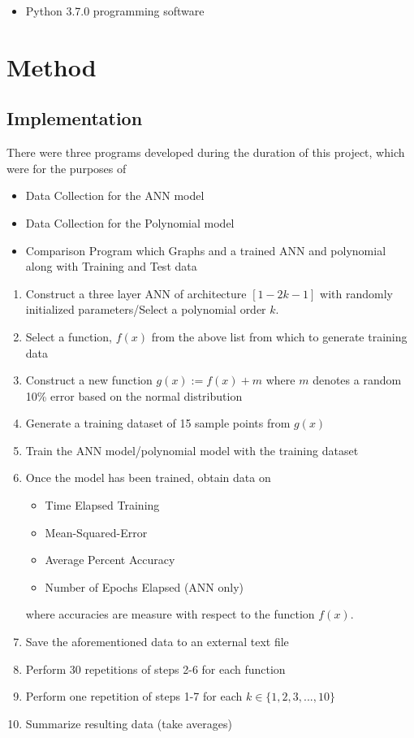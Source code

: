 \documentclass{article}
\begin{document}
\begin{itemize}
    \item Python 3.7.0 programming software
\end{itemize}

\section{Method}

\subsection{Implementation}
There were three programs developed during the duration of this project, which were for the purposes of 
\begin{itemize}
    \item Data Collection for the ANN model
    \item Data Collection for the Polynomial model
    \item Comparison Program which Graphs and a trained ANN and polynomial along with Training and Test data
\end{itemize}

\begin{enumerate}
    \item Construct a three layer ANN of architecture $[1-2k-1]$ with randomly initialized parameters/Select a polynomial order $k$.
    \item Select a function, $f(x)$ from the above list from which to generate training data
    \item Construct a new function $g(x) := f(x) + m$ where $m$ denotes a random 10\% error based on the normal distribution
    \item Generate a training dataset of 15 sample points from $g(x)$
    \item Train the ANN model/polynomial model with the training dataset
    \item Once the model has been trained, obtain data on 
    \begin{itemize}
        \item Time Elapsed Training
        \item Mean-Squared-Error
        \item Average Percent Accuracy
        \item Number of Epochs Elapsed (ANN only)
    \end{itemize}
    where accuracies are measure with respect to the function $f(x)$.
    \item Save the aforementioned data to an external text file
    \item Perform 30 repetitions of steps 2-6 for each function
    \item Perform one repetition of steps 1-7 for each $k \in \{1, 2, 3, ..., 10\}$
    \item Summarize resulting data (take averages)
\end{enumerate}
\end{document}

